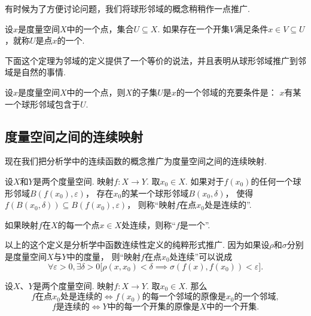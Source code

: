 有时候为了方便讨论问题，我们将球形邻域的概念稍稍作一点推广.
\begin{definition}\label{definition:度量空间.邻域的概念}
设\(x\)是度量空间\(X\)中的一个点，集合\(U \subseteq X\).
如果存在一个开集\(V\)满足条件\(x \in V \subseteq U\)，就称\(U\)是点\(x\)的一个.
\end{definition}
下面这个定理为邻域的定义提供了一个等价的说法，并且表明从球形邻域推广到邻域是自然的事情.
\begin{theorem}
设\(x\)是度量空间\(X\)中的一个点，则\(X\)的子集\(U\)是\(x\)的一个邻域的充要条件是：
\(x\)有某一个球形邻域包含于\(U\).
\end{theorem}

\subsection{度量空间之间的连续映射}
现在我们把分析学中的连续函数的概念推广为度量空间之间的连续映射.

\begin{definition}\label{definition:度量空间.连续映射的概念}
设\(X\)和\(Y\)是两个度量空间.
映射\(f\colon X \to Y\).
取\(x_0 \in X\).
如果对于\(f(x_0)\)的任何一个球形邻域\(B(f(x_0),\varepsilon)\)，
存在\(x_0\)的某一个球形邻域\(B(x_0,\delta)\)，
使得\(f(B(x_0,\delta)) \subseteq B(f(x_0),\varepsilon)\)，
则称“映射\(f\)在点\(x_0\)处是连续的”.

如果映射\(f\)在\(X\)的每一个点\(x \in X\)处连续，则称“\(f\)是一个”.
\end{definition}
以上的这个定义是分析学中函数连续性定义的纯粹形式推广.
因为如果设\(\rho\)和\(\sigma\)分别是度量空间\(X\)与\(Y\)中的度量，
则“映射\(f\)在点\(x_0\)处连续”可以说成\[
\forall\varepsilon>0,
\exists\delta>0
\bigl[
\rho(x,x_0)<\delta
\implies
\sigma(f(x),f(x_0))<\varepsilon
\bigr].
\]

\begin{theorem}\label{theorem:度量空间.度量空间下的连续映射与邻域的联系}
设\(X\)、\(Y\)是两个度量空间.
映射\(f\colon X \to Y\).
取\(x_0 \in X\).
那么\[
\text{\(f\)在点\(x_0\)处是连续的}
\iff
\text{\(f(x_0)\)的每一个邻域的原像是\(x_0\)的一个邻域},
\]\[
\text{\(f\)是连续的}
\iff
\text{\(Y\)中的每一个开集的原像是\(X\)中的一个开集}.
\]
\end{theorem}


\begingroup
\def\T{\mathfrak T}%
\def\oT{\overline{\mathfrak T}}%

